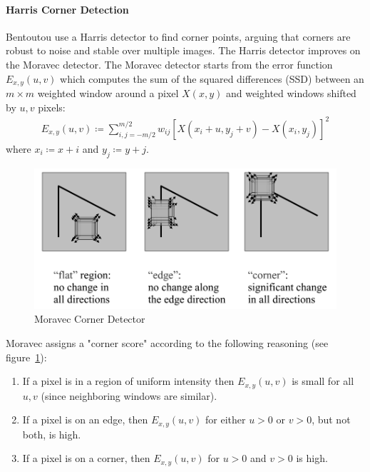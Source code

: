 \paragraph{Harris Corner Detection}
Bentoutou \etal\cite{bentoutou2005automatic} use a Harris detector\cite{harris1988combined} to find corner points, arguing that corners are robust to noise and stable over multiple images.
%
The Harris detector improves on the Moravec\cite{moravec1980obstacle} detector.
%
The Moravec detector starts from the error function $E_{x,y}(u,v)$ which computes the sum of the squared differences (SSD) between an $m \times m$ weighted window around a pixel $X(x, y)$ and weighted windows shifted by $u,v$ pixels:
\begin{equation}
    \begin{split}
        E_{x,y}(u,v) \coloneqq \sum_{i,j=-m/2}^{m/2} w_{ij}\left[ X(x_i+ u,y_j+v) - X(x_i, y_j)\right]^2
    \end{split}
    \label{moravecerrorfunction}
\end{equation}
where $x_i \coloneqq x + i$ and $y_j \coloneqq y+j$.
\begin{figure}
    \centering
    \includegraphics[width=\linewidth,keepaspectratio]{figures/registration/corners.png}
    \caption{Moravec Corner Detector}
    \label{fig:corners}
\end{figure}
Moravec assigns a "corner score" according to the following reasoning (see figure~\ref{fig:corners}):
\begin{enumerate}
    \item If a pixel is in a region of uniform intensity then $E_{x,y}(u,v)$ is small for all $u,v$ (since neighboring windows are similar).
    \item If a pixel is on an edge, then $E_{x,y}(u,v)$ for either $u > 0$ or $v > 0$, but not both, is high.
    \item If a pixel is on a corner, then $E_{x,y}(u,v)$ for $u > 0$ and $v > 0$ is high.
\end{enumerate}

